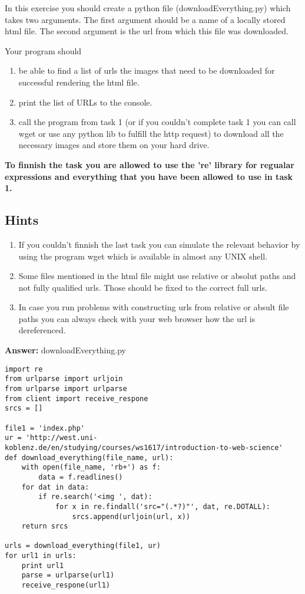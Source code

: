 \documentclass{WeSTassignment}
\begin{document}
In this exercise you should create a python file (downloadEverything.py) which takes two arguments. The first argument should be a name of a locally stored html file. The second argument is the url from which this file was downloaded.

Your program should 
\begin{enumerate}
\item be able to find a list of urls the images that need to be downloaded for successful rendering the html file.
\item print the list of URLs to the console.
\item call the program from task 1 (or if you couldn't complete task 1 you can call wget or use any python lib to fulfill the http request) to download all the necessary images and store them on your hard drive.
\end{enumerate}

\textbf{To finnish the task you are allowed to use the 're' library for regualar expressions and everything that you have been allowed to use in task 1.}

\subsection{Hints}
\begin{enumerate}
\item If you couldn't finnish the last task you can simulate the relevant behavior by using the program wget which is available in almost any UNIX shell. 
\item Some files mentioned in the html file might use relative or absolut paths and not fully qualified urls. Those should be fixed to the correct full urls. 
\item In case you run problems with constructing urls from relative or absult file paths you can always check with your web browser how the url is dereferenced.
\end{enumerate}

\textbf{Answer:} downloadEverything.py
\begin{lstlisting}
import re
from urlparse import urljoin
from urlparse import urlparse
from client import receive_respone
srcs = []

file1 = 'index.php'
ur = 'http://west.uni-koblenz.de/en/studying/courses/ws1617/introduction-to-web-science'
def download_everything(file_name, url):
    with open(file_name, 'rb+') as f:
        data = f.readlines()
    for dat in data:
        if re.search('<img ', dat):
            for x in re.findall('src="(.*?)"', dat, re.DOTALL):
                srcs.append(urljoin(url, x))
    return srcs

urls = download_everything(file1, ur)
for url1 in urls:
    print url1
    parse = urlparse(url1)
    receive_respone(url1)

\end{lstlisting}








\makefooter
\end{document}
